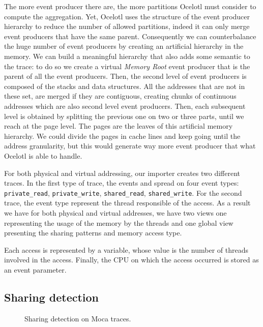 The more event producer there are, the more partitions \gls{Ocelotl} must consider to compute the aggregation.
Yet, \gls{Ocelotl} uses the structure of the event producer hierarchy to reduce the number of allowed partitions, indeed it can only merge event producers that have the same parent.
Consequently we can counterbalance the huge number of event producers by creating an artificial hierarchy in the memory.
We can build a meaningful hierarchy that also adds some semantic to the trace: to do so we create a virtual \emph{Memory Root} event producer that is the parent of all the event producers.
Then, the second level of event producers is composed of the stacks and data structures.
All the addresses that are not in these set, are merged if they are contiguous, creating chunks of continuous addresses which are also second level event producers.
Then, each subsequent level is obtained by splitting the previous one on two or three parts, until we reach at the page level.
The pages are the leaves of this artificial memory hierarchy.
We could divide the pages in cache lines and keep going until the address granularity, but this would generate way more event producer that what \gls{Ocelotl} is able to handle.

For both physical and virtual addressing, our importer creates two different traces.
In the first type of trace, the events and spread on four event types: \texttt{private\_read}, \texttt{private\_write}, \texttt{shared\_read}, \texttt{shared\_write}.
For the second trace, the event type represent the  thread responsible of the access.
As a result we have for both physical and virtual addresses, we have two views one representing the usage of the memory by the threads and one global view presenting the sharing patterns and memory access type.

Each access is represented by a variable, whose value is the number of threads involved in the access.
Finally, the \gls{CPU} on which the access occurred is stored as an event parameter.

\subsection{Sharing detection}

\begin{figure}[htb]
    \centering
    
    \caption{Sharing detection on Moca traces.}
    \label{fig:sharing-detection}
\end{figure}

